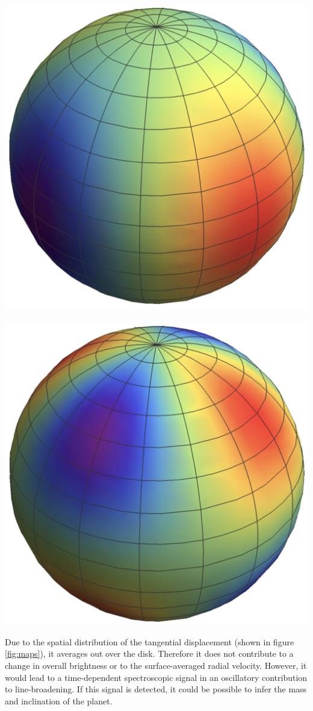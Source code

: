 \documentclass[a0,portrait]{a0poster}
\begin{document}
\begin{multicols}{2}
\begin{center}\vspace{1.0cm}
\includegraphics[width=0.45\linewidth]{radial_map_complex_crop}
~
~
~
~
~
~
\includegraphics[width=0.45\linewidth]{tangential_map_complex_crop}
\label{fig:maps}
\end{center}\vspace{1.0cm}


Due to the spatial distribution of the tangential displacement (shown in figure \ref{fig:maps}), it averages out over the disk. Therefore it does not contribute to a change in overall brightness or to the surface-averaged radial velocity. However, it would lead to a time-dependent spectroscopic signal in an oscillatory contribution to line-broadening. If this signal is detected, it could be possible to infer the mass and inclination of the planet.



\end{multicols}
\end{document}
